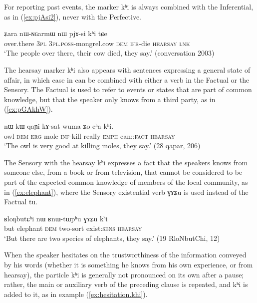 \documentclass[oldfontcommands,oneside,a4paper,11pt]{article}
\newcommand{\ipa}[1]{{\phon \mbox{#1}}} %
\newcommand{\refb}[1]{(\ref{#1})}
\newcommand{\factual}[1]{\textsc{:fact}}
\begin{document}
For reporting past events, the marker \ipa{kʰi} is always combined with the Inferential, as in \refb{ex:pjAsi2}, never with the Perfective.

\begin{exe}
\ex \label{ex:pjAsi2}
\gll \ipa{tɕɤtu} 	\ipa{ʑara} 	\ipa{nɯ-ɴɢarmɯ} 	\ipa{nɯ} 	\ipa{pjɤ-si} 	\ipa{kʰi} 	\ipa{tɕe} \\
over.there \textsc{3pl} \textsc{3pl.poss}-mongrel.cow  \textsc{dem} \textsc{ifr}-die \textsc{hearsay} \textsc{lnk} \\
\glt `The people over there, their cow died, they say.' (conversation 2003)
\end{exe} 
 
 The hearsay marker \ipa{kʰi} also appears with sentences expressing a general state of affair, in which case in can be combined with either a verb in the Factual or the Sensory. The Factual is used to refer to events or states that are part of common knowledge, but that the speaker only knows from a third party, as in \refb{ex:pGAkhW}.
 
 \begin{exe}
\ex \label{ex:pGAkhW}
\gll   \ipa{pɣɤkʰɯ}  	\ipa{nɯ}  	\ipa{kɯ}  	\ipa{qaɲi}  	\ipa{kɤ-sat}  	\ipa{wuma}  	\ipa{ʑo}  	\ipa{cʰa} 	\ipa{kʰi.}  \\
owl \textsc{dem} \textsc{erg} mole \textsc{inf}-kill really \textsc{emph} can:\factual{} \textsc{hearsay} \\
\glt `The owl is very good at killing moles, they say.' (28 qapar, 206)
\end{exe} 
  
  The Sensory with the hearsay \ipa{kʰi} expresses a fact that the speakers knows from someone else, from  a book or from television, that cannot be considered to be part of the expected common knowledge of members of the local community, as in \refb{ex:elephant}, where the Sensory existential verb \ipa{ɣɤʑu} is used instead of the Factual \ipa{tu}.
  
   \begin{exe}
\ex \label{ex:elephant}
\gll   \ipa{tɕeri}  	\ipa{ʁloŋbutɕʰi}  	\ipa{nɯ}  	\ipa{ʁnɯ-tɯpʰu}  	\ipa{ɣɤʑu}  	\ipa{kʰi}  \\
  but elephant \textsc{dem} two-sort exist:\textsc{sens} \textsc{hearsay} \\
\glt `But there are two species of elephants, they say.' (19 RloNbutChi, 12)
\end{exe} 

When the speaker hesitates on the trustworthiness of the information conveyed by his words (whether it is something he knows from his own experience, or from hearsay), the particle \ipa{kʰi} is generally not pronounced on its own after a pause; rather, the main or auxiliary verb of the preceding clause is repeated, and \ipa{kʰi} is added to it, as in example \refb{ex:hesitation.khi}.
\end{document}
